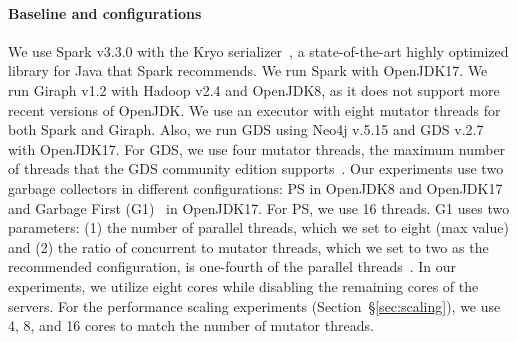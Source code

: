 \paragraph{\textbf{Baseline and \teraheapName{} configurations}}
We use Spark v3.3.0 with the Kryo serializer~\cite{kryo}, a
state-of-the-art highly optimized \teraheapSD library for Java that Spark
recommends.
%
We run Spark with OpenJDK17. We run Giraph v1.2 with Hadoop v2.4
and OpenJDK8, as it does not support more recent versions of OpenJDK.
%
We use an executor with eight mutator threads for
both Spark and Giraph.
%
Also, we run GDS using Neo4j v.5.15 and GDS v.2.7 with OpenJDK17. For GDS, we
use four mutator threads, the maximum number of threads that the GDS community
edition supports~\cite{gds}.
%
Our experiments use two garbage collectors in different configurations: PS in
OpenJDK8 and OpenJDK17 and Garbage First (G1)~\cite{zhao:g1} in OpenJDK17. For
PS, we use 16 \teraheapGC threads.
G1 uses two parameters:
%
(1) the number of parallel \teraheapGC threads, which we set to eight (max
value) and
%
(2) the ratio of concurrent to mutator threads, which we set to two as
the recommended configuration, is one-fourth of the parallel \teraheapGC
threads~\cite{g1:manual}.
%
In our experiments, we utilize eight cores while disabling the remaining cores
of the servers. For the performance scaling experiments
(Section~\S\ref{sec:scaling}), we use 4, 8, and 16 cores to match the number
of mutator threads.

\begin{table}[t]
\centering
\caption{Summary of baselines.}
\label{tab:baselines}
\end{table}

